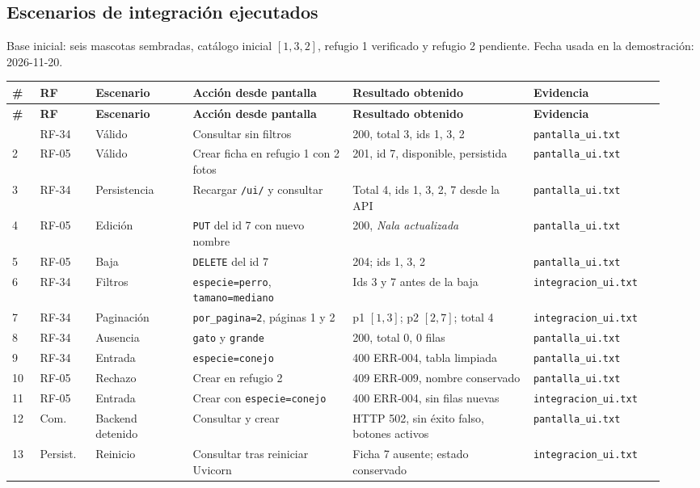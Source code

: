 \documentclass[11pt,a4paper]{article}
\newcommand{\code}[1]{\texttt{#1}}
\newcommand{\thead}[1]{\textbf{#1}}
\begin{document}
\subsection{Escenarios de integración ejecutados}

Base inicial: seis mascotas sembradas, catálogo inicial $[1, 3, 2]$, refugio 1
verificado y refugio 2 pendiente. Fecha usada en la demostración:
2026-11-20.

{\footnotesize
\begin{longtable}{@{}A{0.04\linewidth}A{0.08\linewidth}A{0.14\linewidth}A{0.23\linewidth}A{0.26\linewidth}A{0.19\linewidth}@{}}
\toprule
\thead{\#} & \thead{RF} & \thead{Escenario} & \thead{Acción desde pantalla} &
\thead{Resultado obtenido} & \thead{Evidencia} \\ \midrule \endfirsthead
\thead{\#} & \thead{RF} & \thead{Escenario} & \thead{Acción desde pantalla} &
\thead{Resultado obtenido} & \thead{Evidencia} \\ \midrule \endhead
\bottomrule
{} & RF-34 & Válido & Consultar sin filtros &
200, total 3, ids 1, 3, 2 & \code{pantalla\_ui.txt} \\
2 & RF-05 & Válido & Crear ficha en refugio 1 con 2 fotos &
201, id 7, disponible, persistida & \code{pantalla\_ui.txt} \\
3 & RF-34 & Persistencia & Recargar \code{/ui/} y consultar &
Total 4, ids 1, 3, 2, 7 desde la API & \code{pantalla\_ui.txt} \\
4 & RF-05 & Edición & \code{PUT} del id 7 con nuevo nombre &
200, \emph{Nala actualizada} & \code{pantalla\_ui.txt} \\
5 & RF-05 & Baja & \code{DELETE} del id 7 &
204; ids 1, 3, 2 & \code{pantalla\_ui.txt} \\
6 & RF-34 & Filtros & \code{especie=perro}, \code{tamano=mediano} &
Ids 3 y 7 antes de la baja & \code{integracion\_ui.txt} \\
7 & RF-34 & Paginación & \code{por\_pagina=2}, páginas 1 y 2 &
p1 $[1,3]$; p2 $[2,7]$; total 4 & \code{integracion\_ui.txt} \\
8 & RF-34 & Ausencia & \code{gato} y \code{grande} &
200, total 0, 0 filas & \code{pantalla\_ui.txt} \\
9 & RF-34 & Entrada & \code{especie=conejo} &
400 ERR-004, tabla limpiada & \code{pantalla\_ui.txt} \\
10 & RF-05 & Rechazo & Crear en refugio 2 &
409 ERR-009, nombre conservado & \code{pantalla\_ui.txt} \\
11 & RF-05 & Entrada & Crear con \code{especie=conejo} &
400 ERR-004, sin filas nuevas & \code{integracion\_ui.txt} \\
12 & Com. & Backend detenido & Consultar y crear &
HTTP 502, sin éxito falso, botones activos & \code{pantalla\_ui.txt} \\
13 & Persist. & Reinicio & Consultar tras reiniciar Uvicorn &
Ficha 7 ausente; estado conservado & \code{integracion\_ui.txt} \\
\end{longtable}
}
\end{document}
